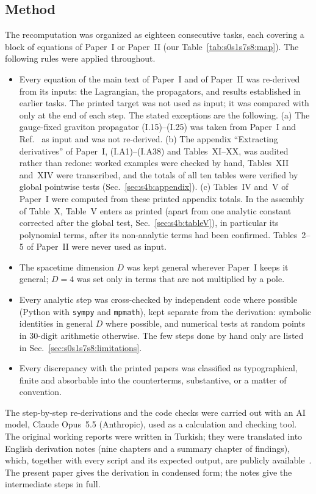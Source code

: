 \documentclass[aps,prd,onecolumn,10pt,nofootinbib,floatfix]{revtex4-2}
\newcommand{\eqI}[1]{(I.#1)}
\begin{document}
\subsection{Method}
\label{sec:s0s1s7s8:method}

The recomputation was organized as eighteen consecutive tasks, each covering a block of equations of Paper~I or Paper~II
(our Table~\ref{tab:s0s1s7s8:map}). The following rules were applied throughout.
\begin{itemize}
\item Every equation of the main text of Paper~I and of Paper~II was re-derived from its inputs: the Lagrangian, the propagators, and
results established in earlier tasks. The printed target was not used as input; it was compared with only at the end of each step.
The stated exceptions are the following. (a) The gauge-fixed graviton propagator \eqI{15}--\eqI{25} was taken from Paper~I and
Ref.~\cite{ref:Tsamis1994} as input and was not re-derived. (b) The appendix ``Extracting derivatives'' of Paper~I, \eqI{A1}--\eqI{A38}
and Tables~XI--XX, was audited rather than redone: worked examples were checked by hand, Tables~XII and~XIV were transcribed, and the
totals of all ten tables were verified by global pointwise tests (Sec.~\ref{sec:s4b:appendix}). (c) Tables~IV and~V of Paper~I were
computed from these printed appendix totals. In the assembly of Table~X, Table~V enters as printed (apart from one analytic
constant corrected after the global test, Sec.~\ref{sec:s4b:tableV}), in particular its polynomial terms, after its non-analytic terms had been confirmed. Tables~2--5 of Paper~II were never used as input.
\item The spacetime dimension $D$ was kept general wherever Paper~I keeps it general; $D=4$ was set only in terms that are not
multiplied by a pole.
\item Every analytic step was cross-checked by independent code where possible (Python with \texttt{sympy} and \texttt{mpmath}), kept
separate from the derivation: symbolic identities in general $D$ where possible, and numerical tests at random points in 30-digit
arithmetic otherwise. The few steps done by hand only are listed in Sec.~\ref{sec:s0s1s7s8:limitations}.
\item Every discrepancy with the printed papers was classified as typographical, finite and absorbable into the counterterms,
substantive, or a matter of convention.
\end{itemize}
The step-by-step re-derivations and the code checks were carried out with an AI model, Claude Opus~5.5 (Anthropic), used as a
calculation and checking tool. The original working reports were written in Turkish; they were translated into English derivation notes
(nine chapters and a summary chapter of findings), which, together with every script and its expected output, are publicly available~\cite{ref:repo}. The present paper
gives the derivation in condensed form; the notes give the intermediate steps in full.
\end{document}
